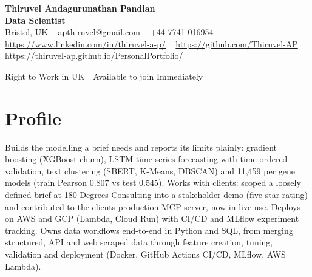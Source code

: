 \documentclass[a4paper,11pt]{article}
\begin{document}
\begin{center}
  {\LARGE\bfseries Thiruvel Andagurunathan Pandian} \\[3pt]
  {\color{headernavy}\small\textbf{Data Scientist}} \\[3pt]
  {\small
  Bristol, UK\nobreak\ \,\textbar\, \href{mailto:apthiruvel@gmail.com}{apthiruvel@gmail.com}\nobreak\ \,\textbar\, \href{tel:+447741016954}{+44 7741 016954}\nobreak\ \,\textbar\, \href{https://www.linkedin.com/in/thiruvel-a-p/}{https://www.linkedin.com/in/thiruvel-a-p/}\nobreak\ \,\textbar\, \href{https://github.com/Thiruvel-AP}{https://github.com/Thiruvel-AP}\nobreak\ \,\textbar\, \href{https://thiruvel-ap.github.io/PersonalPortfolio/}{https://thiruvel-ap.github.io/PersonalPortfolio/}}\par\vspace{4pt}
  \noindent{} Right to Work in UK \,\textbar\, Available to join Immediately
\end{center}

\section{Profile}
Builds the modelling a brief needs and reports its limits plainly: gradient boosting (XGBoost churn), LSTM time series forecasting with time ordered validation, text clustering (SBERT, K-Means, DBSCAN) and 11,459 per gene models (train Pearson 0.807 vs test 0.545). Works with clients: scoped a loosely defined brief at 180 Degrees Consulting into a stakeholder demo (five star rating) and contributed to the client\textquotesingle{}s production MCP server, now in live use. Deploys on AWS and GCP (Lambda, Cloud Run) with CI/CD and MLflow experiment tracking. Owns data workflows end-to-end in Python and SQL, from merging structured, API and web scraped data through feature creation, tuning, validation and deployment (Docker, GitHub Actions CI/CD, MLflow, AWS Lambda).
\end{document}
